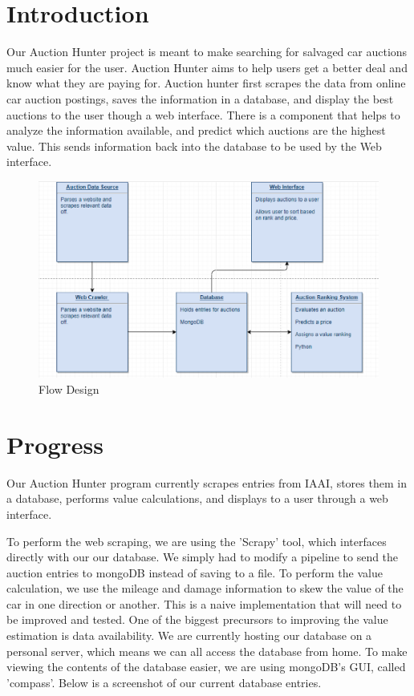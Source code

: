 \documentclass[onecolumn, draftclsnofoot,10pt, compsoc]{IEEEtran}
\begin{document}
\section{Introduction}
Our Auction Hunter project is meant to make searching for salvaged car auctions much easier for the user. Auction Hunter aims to help users get a better deal and know what they are paying for. Auction hunter first scrapes the data from online car auction postings, saves the information in a database, and display the best auctions to the user though a web interface. There is a component that helps to analyze the information available, and predict which auctions are the highest value. This sends information back into the database to be used by the Web interface. 

\begin{figure}[ht]
\centering
\includegraphics[scale=0.75]{flow_capture}
\caption{Flow Design}
\label{fig:flow}
\end{figure}


\section{Progress}  %
Our Auction Hunter program currently scrapes entries from IAAI, stores them in a database, performs value calculations, and displays to a user through a web interface. 

To perform the web scraping, we are using the 'Scrapy' tool, which interfaces directly with our our database. We simply had to modify a pipeline to send the auction entries to mongoDB instead of saving to a file. To perform the value calculation, we use the mileage and damage information to skew the value of the car in one direction or another. This is a naive implementation that will need to be improved and tested. One of the biggest precursors to improving the value estimation is data availability. We are currently hosting our database on a personal server, which means we can all access the database from home. To make viewing the contents of the database easier, we are using mongoDB's GUI, called 'compass'. Below is a screenshot of our current database entries. \cite{MongoDB}
\end{document}
